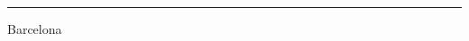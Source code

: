 \begin{titlepage}
  \vspace{0.75cm}
  {\color{black!30}\rule{\textwidth}{0.5pt}}
  \vspace{0.35cm}

  \begin{minipage}[c]{0.55\textwidth}
    {\small Barcelona\par}
  \end{minipage}
  \hfill
  \begin{minipage}[c]{0.38\textwidth}
    \raggedleft
    {\small\bfseries \tfgdate\par}
  \end{minipage}

  \restoregeometry
\end{titlepage}
